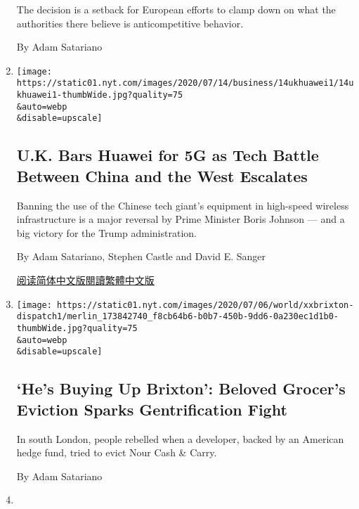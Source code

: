 \begin{enumerate}
  The decision is a setback for European efforts to clamp down on what
  the authorities there believe is anticompetitive behavior.

  By Adam Satariano
\item
  \href{/2020/07/14/business/huawei-uk-5g.html}{}

  \texttt{[image: https://static01.nyt.com/images/2020/07/14/business/14ukhuawei1/14ukhuawei1-thumbWide.jpg?quality=75\\\&auto=webp\\\&disable=upscale]}

  \hypertarget{uk-bars-huawei-for-5g-as-tech-battle-between-china-and-the-west-escalates}{%
  \subsection{U.K. Bars Huawei for 5G as Tech Battle Between China and
  the West
  Escalates}\label{uk-bars-huawei-for-5g-as-tech-battle-between-china-and-the-west-escalates}}

  Banning the use of the Chinese tech giant's equipment in high-speed
  wireless infrastructure is a major reversal by Prime Minister Boris
  Johnson --- and a big victory for the Trump administration.

  By Adam Satariano, Stephen Castle and David E. Sanger

  \href{https://cn.nytimes.com/business/20200715/huawei-uk-5g/}{阅读简体中文版}\href{https://cn.nytimes.com/business/20200715/huawei-uk-5g/zh-hant/}{閱讀繁體中文版}
\item
  \href{/2020/07/06/world/europe/brixton-london-eviction-grocer-nour.html}{}

  \texttt{[image: https://static01.nyt.com/images/2020/07/06/world/xxbrixton-dispatch1/merlin\_173842740\_f8cb64b6-b0b7-450b-9dd6-0a230ec1d1b0-thumbWide.jpg?quality=75\\\&auto=webp\\\&disable=upscale]}

  \hypertarget{hes-buying-up-brixton-beloved-grocers-eviction-sparks-gentrification-fight}{%
  \subsection{`He's Buying Up Brixton': Beloved Grocer's Eviction Sparks
  Gentrification
  Fight}\label{hes-buying-up-brixton-beloved-grocers-eviction-sparks-gentrification-fight}}

  In south London, people rebelled when a developer, backed by an
  American hedge fund, tried to evict Nour Cash \& Carry.

  By Adam Satariano
\item
  \href{/2020/07/05/technology/uber-postmates-deal.html}{}


\end{enumerate}
